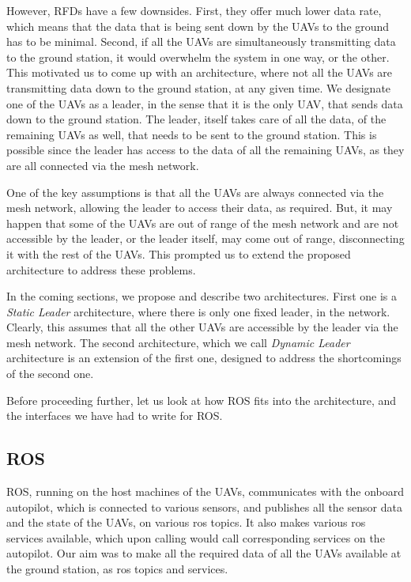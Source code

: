 However, RFDs have a few downsides. First, they offer much lower data rate, which means that the data that is being sent down by the 
UAVs to the ground has to be minimal. Second, if all the UAVs are simultaneously transmitting data to the ground station, it would overwhelm the system in one way, or the other. This motivated us to come up with an architecture, where not all the UAVs are transmitting data down to the ground station, at any given time. We designate one of the UAVs as a leader, in the sense that it is the only UAV, that sends data down to the ground station. The leader, itself takes care of all the data, of the remaining UAVs as well, that needs to be sent to the ground station. This is possible since the leader has access to the data of all the remaining UAVs, as they are all connected via the mesh network.

One of the key assumptions is that all the UAVs are always connected via the mesh network, allowing the leader to access their data, as required. But, it may happen that some of the UAVs are out of range of the mesh network and are not accessible by the leader, or the leader itself, may come out of range, disconnecting it with the rest of the UAVs. This prompted us to extend the proposed architecture to address these problems.

In the coming sections, we propose and describe two architectures. First one is a \textit{Static Leader} architecture, where there is only one fixed leader, in the network. Clearly, this assumes that all the other UAVs are accessible by the leader via the mesh network. The second architecture, which we call \textit{Dynamic Leader} architecture is an extension of the first one, designed to address the shortcomings of the second one.

Before proceeding further, let us look at how ROS fits into the architecture, and the interfaces we have had to write for ROS.

\subsection{ROS}
ROS, running on the host machines of the UAVs, communicates with the onboard autopilot, which is connected to various sensors, and publishes all the sensor data and the state of the UAVs, on various ros topics. It also makes various ros services available, which upon calling would call corresponding services on the autopilot. Our aim was to make all the required data of all the UAVs available at the ground station, as ros topics and services.

